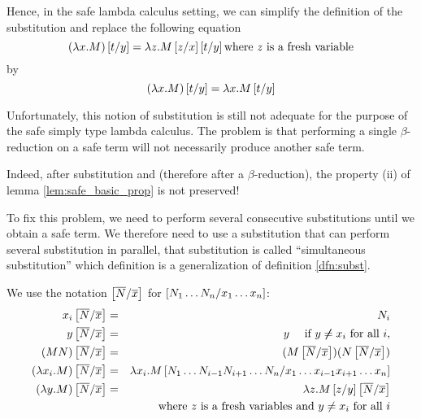 Hence, in the safe lambda calculus setting, we can simplify
the definition of the substitution and replace the following equation
$$(\lambda x . M) \left[ t/y \right] = \lambda z . M \left[ z/x \right]
\left[ t/y \right] \mbox{where $z$ is a fresh variable}$$
by
$$(\lambda x . M) \left[ t/y \right] = \lambda x . M \left[ t/y \right]$$



Unfortunately, this notion of substitution is still not adequate for the purpose of the
safe simply type lambda calculus. The problem is that performing a single
$\beta$-reduction on a safe term will not necessarily produce another safe term.

Indeed, after substitution and (therefore after a $\beta$-reduction), the property (ii) of lemma
\ref{lem:safe_basic_prop} is not preserved!


To fix this problem, we need to perform several consecutive substitutions until we obtain a safe term.
 We therefore need to use a substitution that can perform several substitution in parallel, that substitution is called
``simultaneous substitution'' which definition is a generalization of definition \ref{dfn:subst}.

\begin{dfn}
\label{dnf:simsubst}
 We use the notation
$\left[ \overline{N}/\overline{x} \right]$ for $\left[ N_1 \ldots N_n/x_1
\ldots x_n \right]$:
\begin{eqnarray*}
x_i \left[ \overline{N}/\overline{x} \right] &=& N_i\\
 y \left[ \overline{N}/\overline{x} \right] &=& y \quad \mbox{ if } y \not \neq x_i \mbox{ for all } i,\\
(M N) \left[ \overline{N}/\overline{x} \right] &=& (M \left[ \overline{N}/\overline{x} \right]) (N \left[ \overline{N}/\overline{x} \right]) \\
(\lambda x_i . M) \left[ \overline{N}/\overline{x} \right] &=& \lambda x_i . M
\left[ N_1 \ldots N_{i-1} N_{i+1}\ldots N_n/x_1 \ldots x_{i-1} x_{i+1}\ldots x_n \right] \\
(\lambda y . M)
\left[ \overline{N}/\overline{x} \right] &=& \lambda z . M \left[ z/y \right] \left[ \overline{N}/\overline{x} \right] \\
&& \mbox{where $z$ is a fresh variables and } y \neq x_i \mbox{ for all } i\\
\end{eqnarray*}
\end{dfn}

